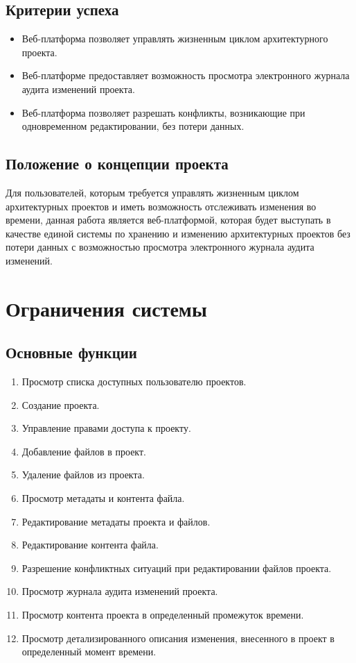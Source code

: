 \documentclass[a4paper,14pt]{extreport} %
\begin{document}
\subsection{Критерии успеха}

\begin{itemize}
\item Веб-платформа позволяет управлять жизненным циклом архитектурного проекта.
\item Веб-платформе предоставляет возможность просмотра электронного журнала аудита изменений проекта.
\item Веб-платформа позволяет разрешать конфликты, возникающие при одновременном редактировании, без потери данных.
\end {itemize}
 
 \subsection{Положение о концепции проекта}
 
Для пользователей, которым требуется управлять жизненным циклом  архитектурных проектов и иметь возможность отслеживать изменения  во времени, данная работа является веб-платформой, которая будет выступать в качестве единой системы по хранению и изменению архитектурных проектов без потери данных с возможностью просмотра электронного журнала аудита изменений.

\newpage
\section{Ограничения системы}
\subsection{Основные функции}

\begin{enumerate}
\item Просмотр списка доступных пользователю проектов.
\item Создание проекта.
\item Управление правами доступа к проекту.
\item Добавление файлов в проект.
\item Удаление файлов из проекта.
\item Просмотр метадаты и контента файла.
\item Редактирование метадаты проекта и файлов.
\item Редактирование контента файла.
\item Разрешение конфликтных ситуаций при редактировании файлов проекта.
\item Просмотр журнала аудита изменений проекта.
\item Просмотр контента проекта в определенный промежуток времени.
\item Просмотр детализированного описания изменения, внесенного в проект в определенный момент времени.
\end {enumerate}
\end{document}
